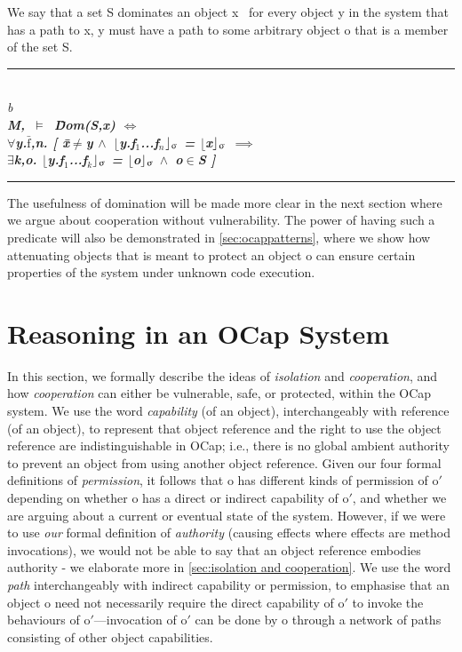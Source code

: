 \documentclass[a4paper,11pt,twoside]{article}
\makeatletter
\newenvironment{logic}
{\begin{minipage}[c]{\linewidth}  \sffamily \mdseries \begin{tabbing}}
{\end{tabbing}\end{minipage}\vspace{0.3em}}
\newcommand{\loin}{$\in$}
\newcommand{\loforall}{$\forall$}
\newcommand{\loexists}{$\exists$}
\newcommand{\loand}{$\land$}
\newcommand{\loneq} {$\neq$}
\newcommand{\loimplies}{$\implies$}
\newcommand{\losigma}{\text{$\upsigma$}}
\newcommand{\loturns} {$\vDash$}
\newcommand{\loiff} {$\iff$}
\newcommand{\loexec}[2] {$\lfloor$#1$\rfloor _{\text{#2}}$}
\newcommand{\loconj}[1] {$\bar{\text{#1}}$}
\newcommand{\lotiff} {\textit{\textls[-20]{iff}}}
\newcommand{\hr}{\rule{\linewidth}{0.4pt}}
\DeclareRobustCommand{\emp}{%
  \@nomath\em \if b\expandafter\@car\f@series\@nil
  \normalfont \else \sffamily \bfseries \fi}
\makeatother
\begin{document}
We say that a set S dominates an object x \lotiff\ for every object y in the system that has a path to x, y must have a path to some arbitrary object o that is a member of the set S. 

\begin{logic}
\hr\\
\emp{Definition---[Domination]}\\
M,\losigma\ \loturns\ \=Dom(S,x) \loiff \\
\> \loforall y.\loconj{f},n. [ \= x\loneq y \loand\ \loexec{y.f$_1$...f$_n$}{\losigma} = \loexec{x}{\losigma} \loimplies\\
\>\> \loexists k,o. \loexec{y.f$_1$...f$_k$}{\losigma} = \loexec{o}{\losigma} \loand\ o\loin S ]\\
\hr
\end{logic}
The usefulness of domination will be made more clear in the next section where we argue about cooperation without vulnerability. The power of having such a predicate will also be demonstrated in \cref{sec:ocappatterns}, where we show how attenuating objects that is meant to protect an object o can ensure certain properties of the system under unknown code execution.\\
\section{Reasoning in an OCap System}\label{sec:ocapreasoning}

In this section, we formally describe the ideas of \textit{isolation} and \textit{cooperation}, and how \textit{cooperation} can either be vulnerable, safe, or protected, within the OCap system. We use the word \textit{capability} (of an object), interchangeably with reference (of an object), to represent that object reference and the right to use the object reference are indistinguishable in OCap; i.e., there is no global ambient authority to prevent an object from using another object reference. Given our four formal definitions of \textit{permission}, it follows that o has different kinds of permission of o$'$ depending on whether o has a direct or indirect capability of o$'$, and whether we are arguing about a current or eventual state of the system. However, if we were to use \textit{our} formal definition of \textit{authority} (causing effects where effects are method invocations), we would not be able to say that an object reference embodies authority - we elaborate more in \cref{sec:isolation and cooperation}. We use the word \textit{path} interchangeably with indirect capability or permission, to emphasise that an object o need not necessarily require the direct capability of o$'$ to invoke the behaviours of o$'$---invocation of o$'$ can be done by o through a network of paths consisting of other object capabilities.\\
\end{document}
